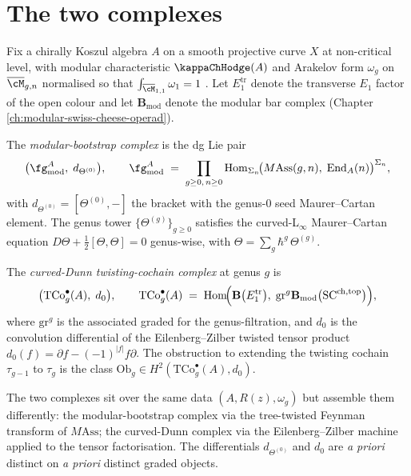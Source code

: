 \section{The two complexes}
\label{sec:two-complexes}

Fix a chirally Koszul algebra \(A\) on a smooth projective curve
\(X\) at non-critical level, with modular characteristic
\(\kappaChHodge(A)\) and Arakelov form \(\omega_{g}\) on
\(\overline{\cM}_{g,n}\) normalised so that
\(\int_{\overline{\cM}_{1,1}} \omega_{1} = 1\)
. Let \(E_{1}^{\mathrm{tr}}\) denote the transverse \(E_{1}\)
factor of the open colour and let \(\mathbf{B}_{\mathrm{mod}}\)
denote the modular bar complex (Chapter
\ref{ch:modular-swiss-cheese-operad}).

\begin{definition}
\label{def:modular-bootstrap-complex}
The \emph{modular-bootstrap complex} is the dg Lie pair
\[
 \bigl(\fg^{A}_{\mathrm{mod}},\; d_{\Theta^{(0)}}\bigr),
 \qquad
 \fg^{A}_{\mathrm{mod}}
 \;=\;
 \prod_{g \ge 0,\, n \ge 0}
 \mathrm{Hom}_{\Sigma_{n}}\!\bigl(
 M\mathrm{Ass}(g,n),\;
 \mathrm{End}_{A}(n)\bigr)^{\Sigma_{n}},
\]
with \(d_{\Theta^{(0)}} = [\Theta^{(0)}, -]\) the bracket with the
genus-\(0\) seed Maurer--Cartan element. The genus tower
\(\{\Theta^{(g)}\}_{g \ge 0}\) satisfies the curved-L\(_{\infty}\)
Maurer--Cartan equation
\(D\Theta + \tfrac{1}{2}[\Theta,\Theta] = 0\) genus-wise, with
\(\Theta = \sum_{g} \hbar^{g}\, \Theta^{(g)}\).
\end{definition}

\begin{definition}
\label{def:curved-dunn-complex}
The \emph{curved-Dunn twisting-cochain complex} at genus \(g\) is
\[
 \bigl(\mathrm{TCo}^{\bullet}_{g}(A),\; d_{0}\bigr),
 \qquad
 \mathrm{TCo}^{\bullet}_{g}(A)
 \;=\;
 \mathrm{Hom}\!\Bigl(
 \mathbf{B}\bigl(E_{1}^{\mathrm{tr}}\bigr),\;
 \mathrm{gr}^{g}\mathbf{B}_{\mathrm{mod}}\bigl(
 \mathrm{SC}^{\mathrm{ch,top}}\bigr)\Bigr),
\]
where \(\mathrm{gr}^{g}\) is the associated graded for the
genus-filtration, and \(d_{0}\) is the convolution differential of
the Eilenberg--Zilber twisted tensor product
\(d_{0}(f) = \partial f - (-1)^{|f|} f \partial\).
The obstruction to extending the twisting cochain \(\tau_{g-1}\) to
\(\tau_{g}\) is the class
\(\mathrm{Ob}_{g} \in H^{2}(\mathrm{TCo}^{\bullet}_{g}(A), d_{0})\).
\end{definition}

The two complexes sit over the same data \((A, R(z), \omega_{g})\)
but assemble them differently: the modular-bootstrap complex via the
tree-twisted Feynman transform of \(M\mathrm{Ass}\); the curved-Dunn
complex via the Eilenberg--Zilber machine applied to the tensor
factorisation. The differentials \(d_{\Theta^{(0)}}\) and \(d_{0}\)
are \emph{a priori} distinct on \emph{a priori} distinct graded
objects.


